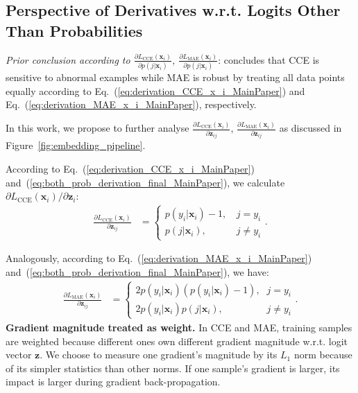 \documentclass{article}
\begin{document}
\subsection{Perspective of Derivatives w.r.t. Logits Other Than Probabilities}


\textit{Prior conclusion according to $\frac{\partial L_{\mathrm{CCE}}(\mathbf{x}_i)}{\partial p(j|\mathbf{x}_i)}$, $\frac{\partial L_{\mathrm{MAE}}(\mathbf{x}_i)}{\partial p(j|\mathbf{x}_i)}$}:
\cite{zhang2018generalized} concludes that CCE is sensitive to abnormal examples while MAE is robust by treating all data points equally according to Eq.~(\ref{eq:derivation_CCE_x_i_MainPaper}) and Eq.~(\ref{eq:derivation_MAE_x_i_MainPaper}), respectively.



In this work, we propose to further analyse $\frac{\partial L_{\mathrm{CCE}}(\mathbf{x}_i)}{\partial \mathbf{z}_{ij}}$, $\frac{\partial L_{\mathrm{MAE}}(\mathbf{x}_i)}{\partial \mathbf{z}_{ij}}$ as discussed in Figure~\ref{fig:embedding_pipeline}. 

\noindent
According to Eq.~(\ref{eq:derivation_CCE_x_i_MainPaper}) and~(\ref{eq:both_prob_derivation_final_MainPaper}), we calculate $\partial L_{\mathrm{CCE}}(\mathbf{x}_i)/ \partial \mathbf{z}_{i}$:
\begin{equation}
	\label{eq:summary_CCE_z_MainPaper}
	\begin{aligned}
		\frac{\partial L_{\mathrm{CCE}}(\mathbf{x}_i)}{\partial \mathbf{z}_{ij}} 
		&=
		\begin{cases} 
			p(y_i|\mathbf{x}_i)-1  \text{, } &j = y_i  \\
			p(j|\mathbf{x}_i)        \text{, } &j \neq y_i
		\end{cases}
		.
	\end{aligned}
\end{equation}

\noindent
Analogously, according to Eq.~(\ref{eq:derivation_MAE_x_i_MainPaper}) and~(\ref{eq:both_prob_derivation_final_MainPaper}), we have:
\begin{equation}
	\label{eq:summary_MAE_z_MainPaper}
	\begin{aligned}
		\frac{\partial L_{\mathrm{MAE}}(\mathbf{x}_i)}{\partial \mathbf{z}_{ij}} 
		&=
		\begin{cases} 
			2 p(y_i|\mathbf{x}_i)
			(p(y_i|\mathbf{x}_i)-1) \text{,} &j = y_i  \\
			2 p(y_i|\mathbf{x}_i)
			p(j|\mathbf{x}_i) \text{,} &j \neq y_i
		\end{cases}
		.
	\end{aligned}
\end{equation}
\noindent
\textbf{{Gradient magnitude treated as weight.}}
In CCE and MAE, training samples are weighted because different ones own different gradient magnitude w.r.t. logit vector $\mathbf{z}$.
We choose to measure one gradient's magnitude by its $L_1$ norm because of its simpler statistics than other norms. If one sample's gradient is larger, its impact is larger during gradient back-propagation. 
\end{document}
